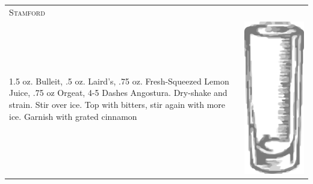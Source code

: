 \documentclass{article}
\begin{document}
\begin{tabular}{p{2in} p{0.5in}}
\multicolumn{2}{p{3in}}{\centering\Huge\textsc{Stamford}} \\ 
  \vspace{-0.1in}1.5 oz. Bulleit, .5 oz. Laird's, .75 oz.  Fresh-Squeezed Lemon Juice, .75 oz Orgeat, 4-5 Dashes Angostura. Dry-shake and strain. Stir over ice. Top with bitters, stir again with more ice. Garnish with grated cinnamon &
  \vspace{-0.1in} \includegraphics{collins.png}
\end{tabular}
\end{document}
